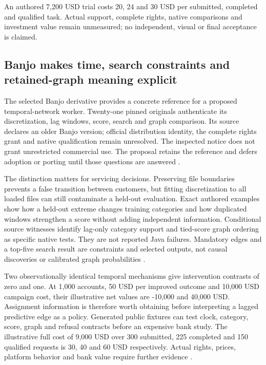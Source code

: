 An authored 7,200 USD trial costs 20, 24 and 30 USD per submitted,
completed and qualified task. Actual support, complete rights, native
comparisons and investment value remain unmeasured; no independent,
visual or final acceptance is claimed.\citep{exec24_weka_choice}

\hypertarget{banjo-makes-time-search-constraints-and-retained-graph-meaning-explicit}{%
\subsection{Banjo makes time, search constraints and retained-graph
meaning
explicit}\label{banjo-makes-time-search-constraints-and-retained-graph-meaning-explicit}}

The selected Banjo derivative provides a concrete reference for a
proposed temporal-network worker. Twenty-one pinned originals
authenticate its discretization, lag windows, score, search and graph
comparison. Its source declares an older Banjo version; official
distribution identity, the complete rights grant and native
qualification remain unresolved. The inspected notice does not grant
unrestricted commercial use. The proposal retains the reference and
defers adoption or porting until those questions are answered
\citep{exec24_banjo_source,exec24_banjo_choice}.

The distinction matters for servicing decisions. Preserving file
boundaries prevents a false transition between customers, but fitting
discretization to all loaded files can still contaminate a held-out
evaluation. Exact authored examples show how a held-out extreme changes
training categories and how duplicated windows strengthen a score
without adding independent information. Conditional source witnesses
identify lag-only category support and tied-score graph ordering as
specific native tests. They are not reported Java failures. Mandatory
edges and a top-five search result are constraints and selected outputs,
not causal discoveries or calibrated graph probabilities
\citep{exec24_banjo_source,exec24_banjo_choice}.

Two observationally identical temporal mechanisms give intervention
contrasts of zero and one. At 1,000 accounts, 50 USD per improved
outcome and 10,000 USD campaign cost, their illustrative net values are
-10,000 and 40,000 USD. Assignment information is therefore worth
obtaining before interpreting a lagged predictive edge as a policy.
Generated public fixtures can test clock, category, score, graph and
refusal contracts before an expensive bank study. The illustrative full
cost of 9,000 USD over 300 submitted, 225 completed and 150 qualified
requests is 30, 40 and 60 USD respectively. Actual rights, prices,
platform behavior and bank value require further evidence
\citep{exec24_banjo_choice}.

